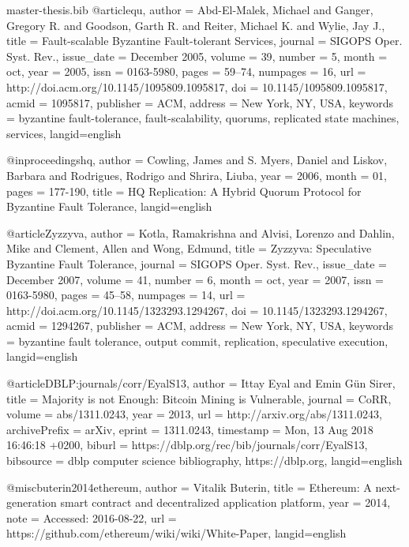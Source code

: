 \begin{filecontents}{master-thesis.bib}
@article{qu,
 author = {Abd-El-Malek, Michael and Ganger, Gregory R. and Goodson, Garth R. and Reiter, Michael K. and Wylie, Jay J.},
 title = {Fault-scalable Byzantine Fault-tolerant Services},
 journal = {SIGOPS Oper. Syst. Rev.},
 issue_date = {December 2005},
 volume = {39},
 number = {5},
 month = oct,
 year = {2005},
 issn = {0163-5980},
 pages = {59--74},
 numpages = {16},
 url = {http://doi.acm.org/10.1145/1095809.1095817},
 doi = {10.1145/1095809.1095817},
 acmid = {1095817},
 publisher = {ACM},
 address = {New York, NY, USA},
 keywords = {byzantine fault-tolerance, fault-scalability, quorums, replicated state machines, services},
 langid={english}
}

@inproceedings{hq,
author = {Cowling, James and S. Myers, Daniel and Liskov, Barbara and Rodrigues, Rodrigo and Shrira, Liuba},
year = {2006},
month = {01},
pages = {177-190},
title = {HQ Replication: A Hybrid Quorum Protocol for Byzantine Fault Tolerance},
 langid={english}
}

@article{Zyzzyva,
 author = {Kotla, Ramakrishna and Alvisi, Lorenzo and Dahlin, Mike and Clement, Allen and Wong, Edmund},
 title = {Zyzzyva: Speculative Byzantine Fault Tolerance},
 journal = {SIGOPS Oper. Syst. Rev.},
 issue_date = {December 2007},
 volume = {41},
 number = {6},
 month = oct,
 year = {2007},
 issn = {0163-5980},
 pages = {45--58},
 numpages = {14},
 url = {http://doi.acm.org/10.1145/1323293.1294267},
 doi = {10.1145/1323293.1294267},
 acmid = {1294267},
 publisher = {ACM},
 address = {New York, NY, USA},
 keywords = {byzantine fault tolerance, output commit, replication, speculative execution},
  langid={english}
} 

@article{DBLP:journals/corr/EyalS13,
  author    = {Ittay Eyal and
               Emin G{\"{u}}n Sirer},
  title     = {Majority is not Enough: Bitcoin Mining is Vulnerable},
  journal   = {CoRR},
  volume    = {abs/1311.0243},
  year      = {2013},
  url       = {http://arxiv.org/abs/1311.0243},
  archivePrefix = {arXiv},
  eprint    = {1311.0243},
  timestamp = {Mon, 13 Aug 2018 16:46:18 +0200},
  biburl    = {https://dblp.org/rec/bib/journals/corr/EyalS13},
  bibsource = {dblp computer science bibliography, https://dblp.org},
   langid={english}
}

@misc{buterin2014ethereum,
  author = {Vitalik Buterin},
  title = {Ethereum: A next-generation smart contract and decentralized application platform},
  year = {2014},
  note = {Accessed: 2016-08-22},
  url = {https://github.com/ethereum/wiki/wiki/White-Paper},
  langid={english}
}


\end{filecontents}
